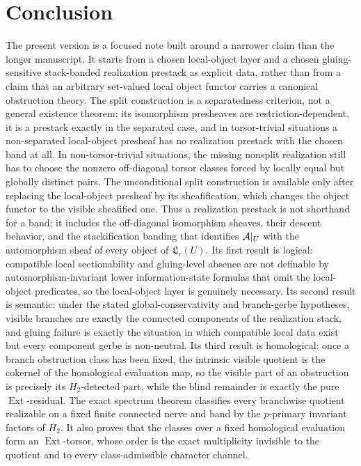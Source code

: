 \section{Conclusion}\label{sec:conclusion}

The present version is a focused note built around a narrower claim than the longer manuscript. It starts from a chosen local-object layer and a chosen gluing-sensitive stack-banded realization prestack as explicit data, rather than from a claim that an arbitrary set-valued local object functor carries a canonical obstruction theory. The split construction is a separatedness criterion, not a general existence theorem: its isomorphism presheaves are restriction-dependent, it is a prestack exactly in the separated case, and in torsor-trivial situations a non-separated local-object presheaf has no realization prestack with the chosen band at all. In non-torsor-trivial situations, the missing nonsplit realization still has to choose the nonzero off-diagonal torsor classes forced by locally equal but globally distinct pairs. The unconditional split construction is available only after replacing the local-object presheaf by its sheafification, which changes the object functor to the visible sheafified one. Thus a realization prestack is not shorthand for a band; it includes the off-diagonal isomorphism sheaves, their descent behavior, and the stackification banding that identifies $\mathcal{A}|_U$ with the automorphism sheaf of every object of $\mathfrak L_r(U)$. Its first result is logical: compatible local sectionability and gluing-level absence are not definable by automorphism-invariant lower information-state formulas that omit the local-object predicates, so the local-object layer is genuinely necessary. Its second result is semantic: under the stated global-conservativity and branch-gerbe hypotheses, visible branches are exactly the connected components of the realization stack, and gluing failure is exactly the situation in which compatible local data exist but every component gerbe is non-neutral. Its third result is homological: once a branch obstruction class has been fixed, the intrinsic visible quotient is the cokernel of the homological evaluation map, so the visible part of an obstruction is precisely its $H_2$-detected part, while the blind remainder is exactly the pure $\operatorname{Ext}$-residual. The exact spectrum theorem classifies every branchwise quotient realizable on a fixed finite connected nerve and band by the $p$-primary invariant factors of $H_2$. It also proves that the classes over a fixed homological evaluation form an $\operatorname{Ext}$-torsor, whose order is the exact multiplicity invisible to the quotient and to every class-admissible character channel.

